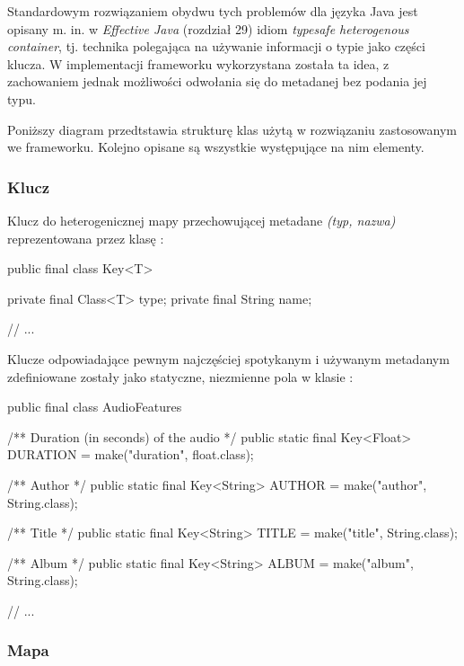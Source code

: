 Standardowym rozwiązaniem obydwu tych problemów dla języka Java jest opisany m. in. w
\textit{Effective Java} (rozdział 29) idiom \emph{typesafe heterogenous container}, tj. technika
polegająca na używanie informacji o typie jako części klucza. W implementacji frameworku
wykorzystana została ta idea, z zachowaniem jednak możliwości odwołania się do metadanej bez podania
jej typu.

Poniższy diagram przedtstawia strukturę klas użytą w rozwiązaniu zastosowanym we frameworku. Kolejno
opisane są wszystkie występujące na nim elementy.


\subsubsection{Klucz}

Klucz do heterogenicznej mapy przechowującej metadane \textit{(typ, nazwa)} reprezentowana przez
klasę :

\begin{java}
public final class Key<T> {

    private final Class<T> type;
    private final String name;

    // ...
}
\end{java}


Klucze odpowiadające pewnym najczęściej spotykanym i używanym metadanym zdefiniowane zostały jako
statyczne, niezmienne pola w klasie :

\begin{java}
public final class AudioFeatures {

    /** Duration (in seconds) of the audio */
    public static final Key<Float> DURATION = make("duration", float.class);

    /** Author */
    public static final Key<String> AUTHOR = make("author", String.class);

    /** Title */
    public static final Key<String> TITLE = make("title", String.class);

    /** Album */
    public static final Key<String> ALBUM = make("album", String.class);

    // ...
}
\end{java}

\subsubsection{Mapa}

